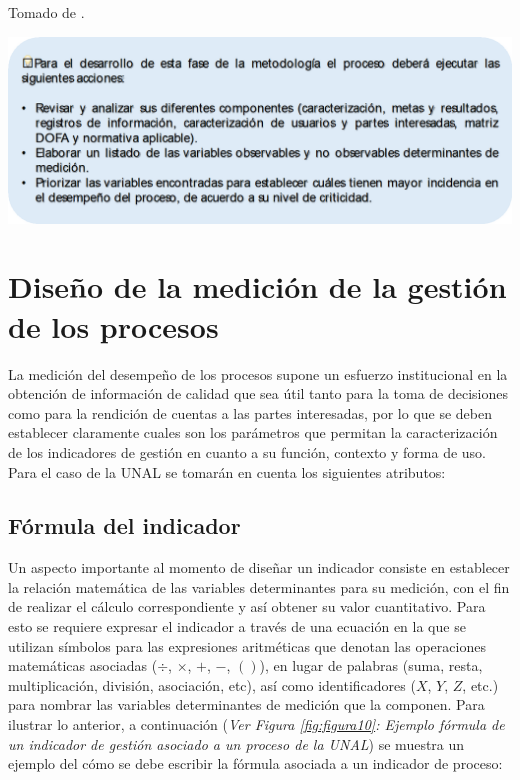\documentclass[
]{book}
\begin{document}
Tomado de \citet{coneval2013manual}.

\begin{center}\includegraphics[width=0.7\linewidth]{Imagenes/texto} \end{center}

\hypertarget{diseuxf1o-de-la-mediciuxf3n-de-la-gestiuxf3n-de-los-procesos}{%
\section{Diseño de la medición de la gestión de los procesos}\label{diseuxf1o-de-la-mediciuxf3n-de-la-gestiuxf3n-de-los-procesos}}

La medición del desempeño de los procesos supone un esfuerzo institucional en la obtención de información de calidad que sea útil tanto para la toma de decisiones como para la rendición de cuentas a las partes interesadas, por lo que se deben establecer claramente cuales son los parámetros que permitan la caracterización de los indicadores de gestión en cuanto a su función, contexto y forma de uso. Para el caso de la UNAL se tomarán en cuenta los siguientes atributos:

\hypertarget{fuxf3rmula-del-indicador}{%
\subsection{Fórmula del indicador}\label{fuxf3rmula-del-indicador}}

Un aspecto importante al momento de diseñar un indicador consiste en establecer la relación matemática de las variables determinantes para su medición, con el fin de realizar el cálculo correspondiente y así obtener su valor cuantitativo. Para esto se requiere expresar el indicador a través de una ecuación en la que se utilizan símbolos para las expresiones aritméticas que denotan las operaciones matemáticas asociadas (\(\div\), \(\times\), \(+\), \(-\), \(()\)), en lugar de palabras (suma, resta, multiplicación, división, asociación, etc), así como identificadores (\(X\), \(Y\), \(Z\), etc.) para nombrar las variables determinantes de medición que la componen. Para ilustrar lo anterior, a continuación (\emph{Ver Figura \ref{fig:figura10}: Ejemplo fórmula de un indicador de gestión asociado a un proceso de la UNAL}) se muestra un ejemplo del cómo se debe escribir la fórmula asociada a un indicador de proceso:
\end{document}
